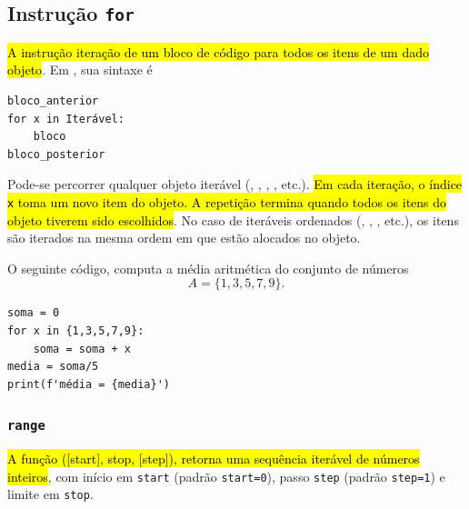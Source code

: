 \subsection{Instrução \texttt{for}}

\hl{A instrução {\PYTHONfor} iteração de um bloco de código para todos os itens de um dado objeto}. Em {\python}, sua sintaxe é

\begin{lstlisting}
bloco_anterior
for x in Iterável:
    bloco
bloco_posterior
\end{lstlisting}

Pode-se percorrer qualquer objeto iterável ({\PYTHONset}, {\PYTHONtuple}, {\PYTHONlist}, {\PYTHONdict}, etc.). \hl{Em cada iteração, o índice \texttt{x} toma um novo item do objeto. A repetição termina quando todos os itens do objeto tiverem sido escolhidos}. No caso de iteráveis ordenados ({\PYTHONtuple}, {\PYTHONlist}, {\PYTHONdict}, etc.), os itens são iterados na mesma ordem em que estão alocados no objeto.

\begin{ex}\label{cap_progest_sec_repete:ex:media_for}
  O seguinte código, computa a média aritmética do conjunto de números
  \begin{equation}
    A = \{1, 3, 5, 7, 9\}.
  \end{equation}

\begin{lstlisting}
soma = 0
for x in {1,3,5,7,9}:
    soma = soma + x
media = soma/5
print(f'média = {media}')
\end{lstlisting}

\end{ex}

\subsubsection{\texttt{range}}

\hl{A função {\PYTHONrange}([start], stop, [step]), retorna uma sequência iterável de números inteiros}, com início em \lstinline+start+ (padrão \lstinline+start=0+), passo \lstinline+step+ (padrão \lstinline+step=1+) e limite em \lstinline+stop+.

